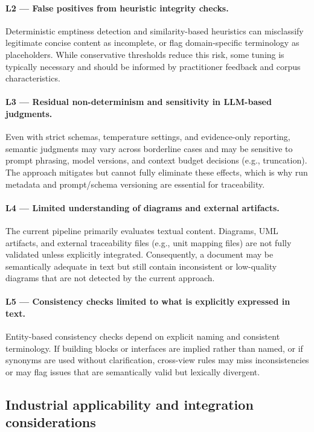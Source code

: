 \paragraph{L2 --- False positives from heuristic integrity checks.}
Deterministic emptiness detection and similarity-based heuristics can misclassify legitimate concise content as incomplete, or flag domain-specific terminology as placeholders. While conservative thresholds reduce this risk, some tuning is typically necessary and should be informed by practitioner feedback and corpus characteristics.

\paragraph{L3 --- Residual non-determinism and sensitivity in LLM-based judgments.}
Even with strict schemas, temperature settings, and evidence-only reporting, semantic judgments may vary across borderline cases and may be sensitive to prompt phrasing, model versions, and context budget decisions (e.g., truncation). The approach mitigates but cannot fully eliminate these effects, which is why run metadata and prompt/schema versioning are essential for traceability.

\paragraph{L4 --- Limited understanding of diagrams and external artifacts.}
The current pipeline primarily evaluates textual content. Diagrams, UML artifacts, and external traceability files (e.g., unit mapping files) are not fully validated unless explicitly integrated. Consequently, a document may be semantically adequate in text but still contain inconsistent or low-quality diagrams that are not detected by the current approach.

\paragraph{L5 --- Consistency checks limited to what is explicitly expressed in text.}
Entity-based consistency checks depend on explicit naming and consistent terminology. If building blocks or interfaces are implied rather than named, or if synonyms are used without clarification, cross-view rules may miss inconsistencies or may flag issues that are semantically valid but lexically divergent.

\subsection{Industrial applicability and integration considerations}
\label{sec:discussion_industrial_applicability}

